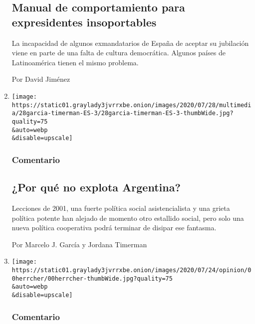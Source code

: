 \begin{enumerate}
  \hypertarget{manual-de-comportamiento-para-expresidentes-insoportables}{%
  \subsection{Manual de comportamiento para expresidentes
  insoportables}\label{manual-de-comportamiento-para-expresidentes-insoportables}}

  La incapacidad de algunos exmandatarios de España de aceptar su
  jubilación viene en parte de una falta de cultura democrática. Algunos
  países de Latinoamérica tienen el mismo problema.

  Por David Jiménez
\item
  \href{/es/2020/07/28/espanol/opinion/argentina-estallido-2001-coronavirus.html}{}

  \texttt{[image: https://static01.graylady3jvrrxbe.onion/images/2020/07/28/multimedia/28garcia-timerman-ES-3/28garcia-timerman-ES-3-thumbWide.jpg?quality=75\\\&auto=webp\\\&disable=upscale]}

  \hypertarget{comentario-9}{%
  \subsubsection{Comentario}\label{comentario-9}}

  \hypertarget{por-quuxe9-no-explota-argentina}{%
  \subsection{¿Por qué no explota
  Argentina?}\label{por-quuxe9-no-explota-argentina}}

  Lecciones de 2001, una fuerte política social asistencialista y una
  grieta política potente han alejado de momento otro estallido social,
  pero solo una nueva política cooperativa podrá terminar de disipar ese
  fantasma.

  Por Marcelo J. García y Jordana Timerman
\item
  \href{/es/2020/07/27/espanol/opinion/clases-universidad-coronavirus.html}{}

  \texttt{[image: https://static01.graylady3jvrrxbe.onion/images/2020/07/24/opinion/00herrcher/00herrcher-thumbWide.jpg?quality=75\\\&auto=webp\\\&disable=upscale]}

  \hypertarget{comentario-10}{%
  \subsubsection{Comentario}\label{comentario-10}}


\end{enumerate}

